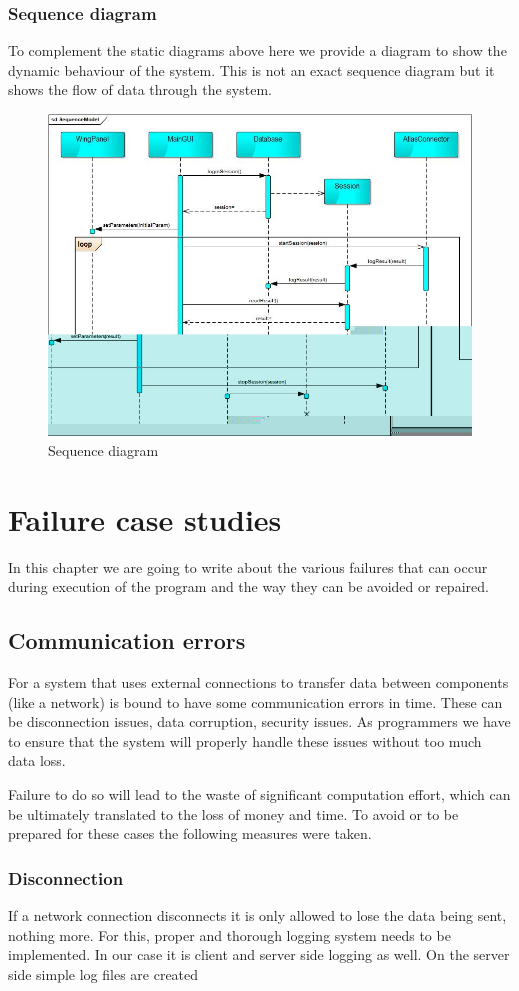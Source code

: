 \documentclass[10pt,a4paper]{report}
\begin{document}
\subsection{Sequence diagram}
To complement the static diagrams above here we provide a diagram to show the dynamic behaviour of the system. This is not an exact sequence diagram but it shows the flow of data through the system.
\begin{figure}[h!]
\includegraphics[width=\textwidth]{SequenceModel.jpg}
\caption{Sequence diagram}
\end{figure}

\chapter{Failure case studies}
In this chapter we are going to write about the various failures that can occur during execution of the program and the way they can be avoided or repaired.
\section{Communication errors}
For a system that uses external connections to transfer data between components (like a network) is bound to have some communication errors in time. These can be disconnection issues, data corruption, security issues. As programmers we have to ensure that the system will properly handle these issues without too much data loss.

Failure to do so will lead to the waste of significant computation effort, which can be ultimately translated to the loss of money and time. To avoid or to be prepared for these cases the following measures were taken.

\subsection{Disconnection}
If a network connection disconnects it is only allowed to lose the data being sent, nothing more. For this, proper and thorough logging system needs to be implemented. In our case it is client and server side logging as well. On the server side simple log files are created 
\end{document}
